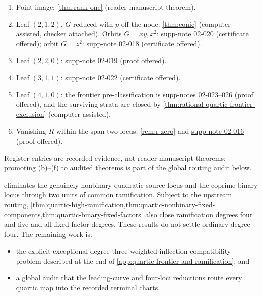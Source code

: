 \documentclass[11pt,reqno]{amsart}
\begin{document}
\begin{remark}
\label{rem:leaf-accounting}
\begin{enumerate}[label=(\alph*)]
\item Point image: \cref{thm:rank-one} (reader-manuscript theorem).
\item Leaf \((2,1,2)\), \(G\) reduced with \(p\) off the node:
\cref{thm:conic} (computer-assisted, checker attached).  Orbits
\(G=xy,x^2\): \hyperref[supp-note-02-020]{supp-note 02-020}
(certificate offered); orbit \(G=z^2\):
\hyperref[supp-note-02-018]{supp-note 02-018} (certificate offered).
\item Leaf \((2,2,0)\):
\hyperref[supp-note-02-019]{supp-note 02-019} (proof offered).
\item Leaf \((3,1,1)\):
\hyperref[supp-note-02-022]{supp-note 02-022} (certificate offered).
\item Leaf \((4,1,0)\): the frontier pre-classification is
\hyperref[supp-note-02-023]{supp-notes 02-023}--026 (proof offered), and
the surviving strata are closed by
\cref{thm:rational-quartic-frontier-exclusion} (computer-assisted).
\item Vanishing \(R\) within the span-two locus: \cref{rem:r-zero}
and \hyperref[supp-note-02-016]{supp-note 02-016} (proof offered).
\end{enumerate}
Register entries are recorded evidence, not reader-manuscript theorems;
promoting (b)--(f) to audited theorems is part of the global routing
audit below.
\end{remark}
 eliminates the genuinely
nonbinary quadratic-source locus and the coprime binary locus through two
units of common ramification.  Subject to the upstream routing,
\cref{thm:quartic-high-ramification,thm:quartic-nonbinary-fixed-components,thm:quartic-binary-fixed-factors}
also close ramification degrees four and five and all fixed-factor degrees.
These results do not settle ordinary degree four.  The remaining work is:

\begin{itemize}
\item the explicit exceptional degree-three weighted-inflection
compatibility problem described at the end of
\cref{app:quartic-frontier-and-ramification}; and
\item a global audit that the leading-curve and four-loci reductions route
every quartic map into the recorded terminal charts.
\end{itemize}
\end{document}

